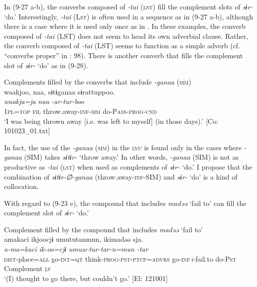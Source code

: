 In (9-27 a-b), the converbs composed of \textit{{}-tai} (\textsc{lst}) fill the complement slots of \textit{sɨr-} ‘do.’ Interestingly, \textit{{}-tai} (L\textsc{st}) is often used in a sequence as in (9-27 a-b), although there is a case where it is used only once as in . In these examples, the converb composed of \textit{{}-tai} (LST) does not seem to head its own adverbial clause. Rather, the converb composed of \textit{{}-tai} (LST) seems to function as a simple adverb (cf. “converbs proper” in \citealt{Nedjalkov1995}: 98). There is another converb that fills the complement slot of \textit{sɨr-} ‘do’ as in (9-28).

\ea   Complements filled by the converbs that include \textit{{}-ganaa} (\textsc{sim}) \label{ex:9.28}\\
 \glll  waakjoo,  naa,  sɨtɨganaa  sɨrattuppoo.\\
    \textit{waakja=ja}  \textit{naa}  \textit{}  \textit{-ar-tur-boo}\\
    1\textsc{pl}=\textsc{top}  \textsc{fil}  throw.away-\textsc{inf}-\textsc{sim}  do-P\textsc{ass}-\textsc{prog}-\textsc{cnd}\\
    \glt     ‘I was being thrown away [i.e. was left to myself] (in those days).’ [Co: 101023\_01.txt]
\z

In fact, the use of the \textit{{}-ganaa} (\textsc{sim}) in the \textsc{lvc} is found only in the cases where \textit{{}-ganaa} (SIM) takes \textit{sɨtɨr-} ‘throw away.’ In other words, \textit{{}-ganaa} (SIM) is not as productive as \textit{{}-tai} (\textsc{lst}) when used as complements of \textit{sɨr-} ‘do.’ I propose that the combination of \textit{sɨtɨr-∅-ganaa} (throw.away-\textsc{inf}-SIM) and \textit{sɨr-} ‘do’ is a kind of collocation.

With regard to (9-23 e), the compound that includes \textit{madəə} ‘fail to’ can fill the complement slot of \textit{sɨr-} ‘do.’

\ea   Complement filled by the compound that includes \textit{madəə} ‘fail to’ \label{ex:9.29}\\
 \gllll  amakaci  ikjoocjɨ  umututanmun,   ikimadəə  sja.  \\
    \textit{a-ma=kaci}  \textit{ik-oo=cjɨ}  \textit{umuw-tur-tar-n=mun}    \textit{}  \textit{-tar} \\
    \textsc{dist}-place=\textsc{all}  go-\textsc{int}=\textsc{qt}  think-\textsc{prog}-\textsc{pst}-\textsc{ptcp}=\textsc{advrs}  go-\textsc{inf}+fail.to  do-P\textsc{st}  \\
        {}               {}                   {}                 Complement  \textsc{lv}  \\
  \glt     ‘(I) thought to go there, but couldn’t go.’ [El: 121001]
\z

